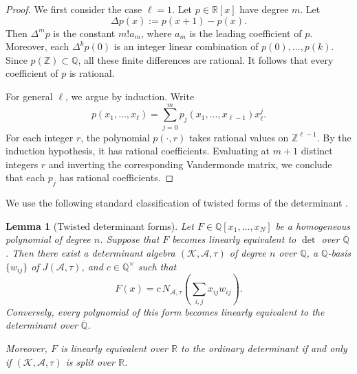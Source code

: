 \documentclass[reqno,11pt]{amsart}
\numberwithin{equation}{section}
\newtheorem{lemma}[theorem]{Lemma}
\theoremstyle{definition}
\theoremstyle{remark}
\begin{document}
\begin{proof}
We first consider the case $\ell=1$. Let $p\in\mathbb R[x]$ have degree
$m$. Let
$$
    \Delta p(x):=p(x+1)-p(x).
$$
 Then $\Delta^m p$ is the constant $m!a_m$, where $a_m$ is the leading coefficient of $p$. Moreover,
each $\Delta^k p(0)$ is an integer linear combination of
$p(0),\dots,p(k)$. Since $p(\mathbb Z)\subset\mathbb Q$, all these
finite differences are rational. It follows that every coefficient of
$p$ is rational.

For general $\ell$, we argue by induction. Write
$$
    p(x_1,\dots,x_\ell)
    =
    \sum_{j=0}^m p_j(x_1,\dots,x_{\ell-1})x_\ell^j.
$$
For each integer $r$, the polynomial $p(\cdot,r)$ takes rational values
on $\mathbb Z^{\ell-1}$. By the induction hypothesis, it has rational
coefficients. Evaluating at $m+1$ distinct integers $r$ and inverting
the corresponding Vandermonde matrix, we conclude that each $p_j$ has
rational coefficients.
\end{proof}

We use the following standard classification of twisted forms of the
determinant \cite{WaterhouseTwistedDeterminant}.

\begin{lemma}[Twisted determinant forms]
\label{lem:twisted-determinant-forms}
Let $F\in\mathbb Q[x_1,\dots,x_N]$ be a homogeneous polynomial of degree
$n$. Suppose that $F$ becomes linearly equivalent to $\det$ over
$\overline{\mathbb Q}$. Then there exist a determinant algebra
$(\mathscr{K},\mathscr{A},\tau)$ of degree $n$ over $\mathbb Q$, a
$\mathbb Q$-basis $\{w_{ij}\}$ of $J(\mathscr{A},\tau)$, and $c\in\mathbb Q^\times$ such that
$$ F(x)
    =
    c\, N_{\mathscr{A},\tau}\!\left(\sum_{i,j}x_{ij}w_{ij}\right).
$$
 Conversely, every polynomial of this
form becomes linearly equivalent to the determinant over
$\overline{\mathbb Q}$.

Moreover, $F$ is linearly equivalent over $\mathbb R$ to the ordinary
determinant if and only if $(\mathscr{K},\mathscr{A},\tau)$ is split over $\mathbb R$.
\end{lemma}
\end{document}
